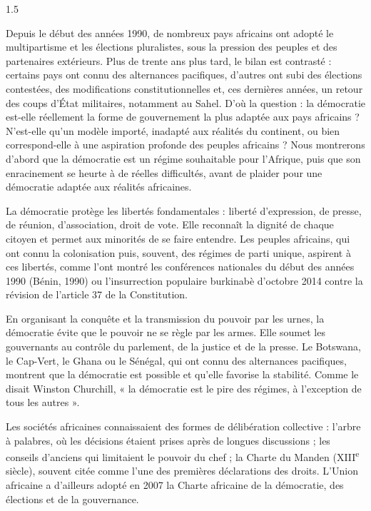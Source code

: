 \documentclass[12pt]{article}
\begin{document}
\begin{spacing}{1.5}


Depuis le début des années 1990, de nombreux pays africains ont adopté le multipartisme et les élections pluralistes, sous la pression des peuples et des partenaires extérieurs. Plus de trente ans plus tard, le bilan est contrasté : certains pays ont connu des alternances pacifiques, d'autres ont subi des élections contestées, des modifications constitutionnelles et, ces dernières années, un retour des coups d'État militaires, notamment au Sahel. D'où la question : la démocratie est-elle réellement la forme de gouvernement la plus adaptée aux pays africains ? N'est-elle qu'un modèle importé, inadapté aux réalités du continent, ou bien correspond-elle à une aspiration profonde des peuples africains ? Nous montrerons d'abord que la démocratie est un régime souhaitable pour l'Afrique, puis que son enracinement se heurte à de réelles difficultés, avant de plaider pour une démocratie adaptée aux réalités africaines.


La démocratie protège les libertés fondamentales : liberté d'expression, de presse, de réunion, d'association, droit de vote. Elle reconnaît la dignité de chaque citoyen et permet aux minorités de se faire entendre. Les peuples africains, qui ont connu la colonisation puis, souvent, des régimes de parti unique, aspirent à ces libertés, comme l'ont montré les conférences nationales du début des années 1990 (Bénin, 1990) ou l'insurrection populaire burkinabè d'octobre 2014 contre la révision de l'article 37 de la Constitution.

En organisant la conquête et la transmission du pouvoir par les urnes, la démocratie évite que le pouvoir ne se règle par les armes. Elle soumet les gouvernants au contrôle du parlement, de la justice et de la presse. Le Botswana, le Cap-Vert, le Ghana ou le Sénégal, qui ont connu des alternances pacifiques, montrent que la démocratie est possible et qu'elle favorise la stabilité. Comme le disait Winston Churchill, « la démocratie est le pire des régimes, à l'exception de tous les autres ».

Les sociétés africaines connaissaient des formes de délibération collective : l'arbre à palabres, où les décisions étaient prises après de longues discussions ; les conseils d'anciens qui limitaient le pouvoir du chef ; la Charte du Manden (XIII\textsuperscript{e} siècle), souvent citée comme l'une des premières déclarations des droits. L'Union africaine a d'ailleurs adopté en 2007 la Charte africaine de la démocratie, des élections et de la gouvernance.


\end{spacing}
\end{document}
